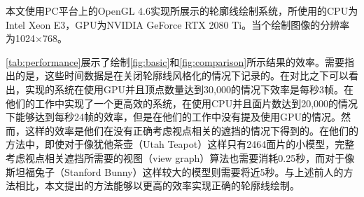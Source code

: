 本文使用PC平台上的OpenGL 4.6实现所展示的\stc{}轮廓线绘制系统，所使用的CPU为Intel Xeon E3，GPU为NVIDIA GeForce RTX 2080 Ti。当个绘制图像的分辨率为1024$\times$768。

\autoref{tab:performance}展示了绘制\autoref{fig:basic}和\autoref{fig:comparison}所示结果的效率。需要指出的是，这些时间数据是在关闭轮廓线风格化的情况下记录的。在对比之下可以看出，\citeauthor{kim2013stereoscopic}实现的系统\cite{kim2013stereoscopic}在使用GPU并且顶点数量达到30,000的情况下效率是每秒3帧。\citeauthor{bukenberger2018stereo}在他们的工作中实现了一个更高效的系统\cite{bukenberger2018stereo}，在使用CPU并且面片数达到20,000的情况下能够达到每秒24帧的效率，但是在他们的工作中没有提及使用GPU的情况。然而，这样的效率是他们在没有正确考虑视点相关的遮挡的情况下得到的。在他们的方法中，即使对于像犹他茶壶（Utah Teapot）这样只有2464面片的小模型，完整考虑视点相关遮挡所需要的视图（view graph）算法也需要消耗0.25秒，而对于像斯坦福兔子（Stanford Bunny）这样较大的模型则需要将近5秒。与上述前人的方法相比，本文提出的方法能够以更高的效率实现正确的\stc{}轮廓线绘制。